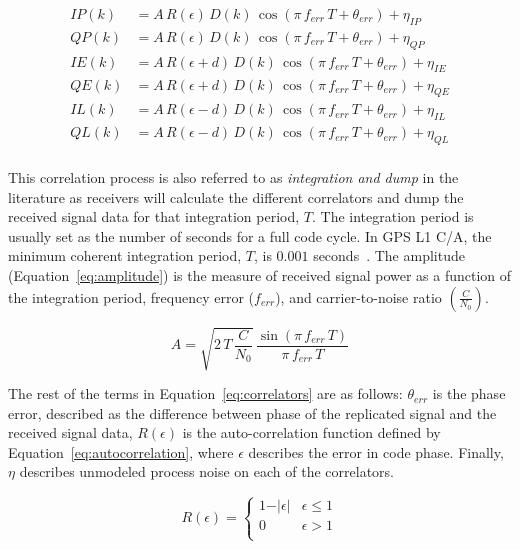 \begin{equation}\label{eq:correlators}
    \begin{split}
        IP(k) & = A\,R(\epsilon)\,D(k)\,\cos\left(\pi \,f_{err}\,T + \theta_{err}\right) + \eta_{IP}\\
        QP(k) & = A\,R(\epsilon)\,D(k)\,\cos\left(\pi \,f_{err}\,T + \theta_{err}\right) + \eta_{QP}\\
        IE(k) & = A\,R(\epsilon + d)\,D(k)\,\cos\left(\pi \,f_{err}\,T + \theta_{err}\right) + \eta_{IE}\\
        QE(k) & = A\,R(\epsilon + d)\,D(k)\,\cos\left(\pi \,f_{err}\,T + \theta_{err}\right) + \eta_{QE}\\
        IL(k) & = A\,R(\epsilon - d)\,D(k)\,\cos\left(\pi \,f_{err}\,T + \theta_{err}\right) + \eta_{IL}\\
        QL(k) & = A\,R(\epsilon - d)\,D(k)\,\cos\left(\pi \,f_{err}\,T + \theta_{err}\right) + \eta_{QL}\\
    \end{split}
\end{equation}

This correlation process is also referred to as \textit{integration and dump} in the literature as receivers will calculate the different correlators and dump the received signal data for that integration period, \(T\). The integration period is usually set as the number of seconds for a full code cycle. In GPS L1 C/A, the minimum coherent integration period, \(T\), is \(0.001\) seconds~\cite{akosGNSSSoftwareDefined2022}. The amplitude (Equation~\ref{eq:amplitude}) is the measure of received signal power as a function of the integration period, frequency error (\(f_{err}\)), and carrier-to-noise ratio \(\left(\frac{C}{N_0}\right)\).

\begin{equation}\label{eq:amplitude}
    A = \sqrt{2\,T\,\frac{C}{N_0}}\, \frac{\sin\left(\pi \, f_{err} \, T \right)}{\pi \, f_{err} \, T}
\end{equation}

The rest of the terms in Equation~\ref{eq:correlators} are as follows: \(\theta_{err}\) is the phase error, described as the difference between phase of the replicated signal and the received signal data, \(R(\epsilon)\) is the auto-correlation function defined by Equation~\ref{eq:autocorrelation}, where \(\epsilon \) describes the error in code phase. Finally, \(\eta \) describes unmodeled process noise on each of the correlators.

\begin{equation}\label{eq:autocorrelation}
    R(\epsilon) =
    \begin{cases}
        1 - \vert \epsilon \vert & \epsilon \leq 1 \\
        0                        & \epsilon > 1    \\
    \end{cases}
\end{equation}

